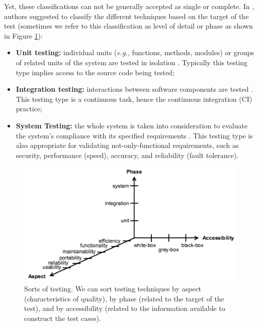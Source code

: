 Yet, these classifications can not be generally accepted as
single or complete. In \cite{4425813}, authors suggested to
classify the different techniques based on the target of the test
(sometimes we refer to this classification as level of detail or
phase as shown in Figure \ref{fig:sorts-of-testing}):

\begin{itemize}
    \item \textbf{Unit testing:} individual units (\emph{e.g.},
        functions, methods, modules) or groups of related units
        of the system are tested in isolation
        \cite{ieee610121990}. Typically this testing type implies
        access to the source code being tested;

    \item \textbf{Integration testing:} interactions between
        software components are tested \cite{ieee610121990}. This
        testing type is a continuous task, hence the continuous
        integration (CI) practice;

    \item \textbf{System Testing:} the whole system is taken into
        consideration to evaluate the system's compliance with
        its specified requirements \cite{ieee610121990}. This
        testing type is also appropriate for validating
        not-only-functional requirements, such as security,
        performance (speed), accuracy, and reliability (fault
        tolerance).
\end{itemize}

\begin{figure}[ht]
    \begin{center}
    \includegraphics[width=1.0\linewidth]{figures/sorts-of-testing.png}
    \end{center}

    \caption{Sorts of testing. We can sort testing techniques by
    aspect (characteristics of quality), by phase (related to the
    target of the test), and by accessibility (related to the
    information available to construct the test cases).}
    \label{fig:sorts-of-testing}
\end{figure}

